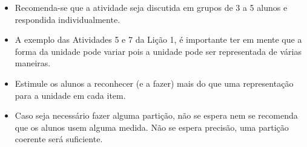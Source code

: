 \begin{multicols}{2}
\begin{orientacoes}
  \begin{itemize} %
    \item Recomenda-se que a atividade seja discutida em grupos de 3 a 5 alunos e respondida individualmente.
 \item A exemplo das Atividades 5 e 7 da Lição 1, é importante ter em mente que a forma da unidade pode variar pois a unidade pode ser representada de várias maneiras.
    \item Estimule os alunos a reconhecer (e a fazer) mais do que uma representação para a unidade em cada item.
    \item Caso seja necessário fazer alguma partição, não se espera nem se recomenda que os alunos usem alguma medida. Não se espera precisão, uma partição coerente será suficiente. 
\end{itemize} %
\end{orientacoes}
%



\end{multicols}
